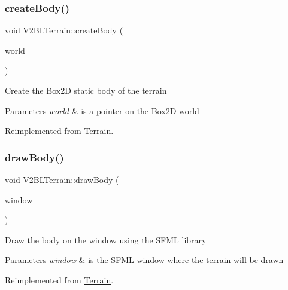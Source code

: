\subsubsection{\texorpdfstring{create\+Body()}{createBody()}}
{\footnotesize\ttfamily void V2\+B\+L\+Terrain\+::create\+Body (\begin{DoxyParamCaption}\item[{b2\+World $\ast$}]{world }\end{DoxyParamCaption})\hspace{0.3cm}{\ttfamily [virtual]}}

Create the Box2D static body of the terrain 
\begin{DoxyParams}{Parameters}
{\em world} & is a pointer on the Box2D world \\
\hline
\end{DoxyParams}


Reimplemented from \mbox{\hyperlink{class_terrain_a97e007277f8abb9dde20ef2b49c38a3a}{Terrain}}.

\mbox{\label{class_v2_b_l_terrain_aea63be5e3b6d05da4c3b5ce954429a4b}} 
\subsubsection{\texorpdfstring{draw\+Body()}{drawBody()}}
{\footnotesize\ttfamily void V2\+B\+L\+Terrain\+::draw\+Body (\begin{DoxyParamCaption}\item[{sf\+::\+Render\+Window \&}]{window }\end{DoxyParamCaption})\hspace{0.3cm}{\ttfamily [virtual]}}

Draw the body on the window using the S\+F\+ML library 
\begin{DoxyParams}{Parameters}
{\em window} & is the S\+F\+ML window where the terrain will be drawn \\
\hline
\end{DoxyParams}


Reimplemented from \mbox{\hyperlink{class_terrain_ae60571b91c1979fa94bdfc5002da6ac7}{Terrain}}.

\mbox{\label{class_v2_b_l_terrain_a0534b144e38d8ffea797c3713b3d5380}} 
